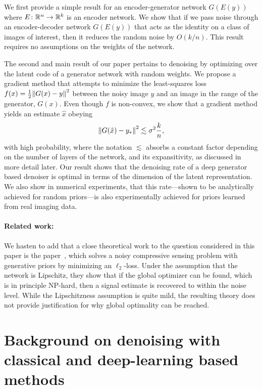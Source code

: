 We first provide a simple result for an encoder-generator network $G( E(y) )$ where $E \colon \mathbb{R}^n \to \mathbb{R}^k$ is an encoder network.
We show that if we pass noise through an encoder-decoder network $G( E(y) )$ that acts as the identity on a class of images of interest, then it reduces the random noise by $O(k/n)$. 
This result requires no assumptions on the weights of the network.

The second and main result of our paper pertains to denoising by optimizing over the latent code of a generator network with random weights.
We propose a gradient method 
that attempts to minimize the least-squares loss $f(x) = \frac{1}{2} {\left\|G(x) - y\right\|}_{}^2$ between the noisy image $y$ and an image in the range of the generator, $G(x)$. Even though $f$ is non-convex, we show that a gradient method yields an estimate $\hat x$ obeying
\begin{align*}
{\left\|G(\hat x) - y_\ast\right\|}_{}^2
\lesssim \sigma^2 \frac{k}{n},
\end{align*}
with high probability, where the notation $\lesssim$ absorbs a constant factor depending on the number of layers of the network, and its expansitivity, as discussed in more detail later.
Our result shows that the denoising rate of a deep generator based denoiser is optimal in terms of the dimension of the latent representation.
We also show in numerical experiments, that this rate---shown to be analytically achieved for random priors---is also experimentally achieved for priors learned from real imaging data.

\paragraph{Related work:}
We hasten to add that a close theoretical work to the question considered in this paper is the paper~\citep{bora_compressed_2017}, which solves a noisy compressive sensing problem with generative priors by minimizing an $\ell_2$-loss. Under the assumption that the network is Lipschitz, they show that if the global optimizer can be found, which is in principle NP-hard, then a signal estimate is recovered to within the noise level.  While the Lipschitzness assumption is quite mild, the resulting theory does not provide justification for why global optimality can be reached.


\section{Background on denoising with classical and deep-learning based methods}


